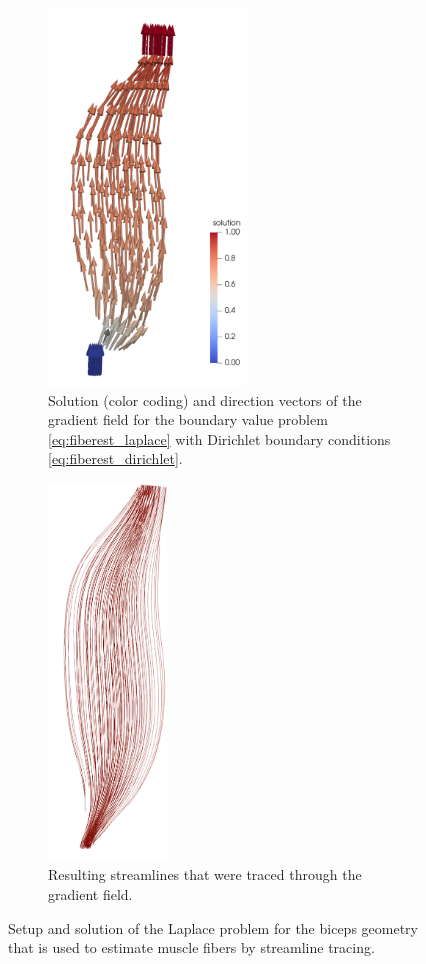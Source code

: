 \begin{figure}%
  \centering%
  \begin{subfigure}[t]{0.48\textwidth}%
    \centering%
    \includegraphics[height=10cm]{images/fiber_creation/potential_flow.png}%
    \caption{Solution (color coding) and direction vectors of the gradient field for the boundary value problem \cref{eq:fiberest_laplace} with Dirichlet boundary conditions \cref{eq:fiberest_dirichlet}.}%
    \label{fig:potential_flow}%
  \end{subfigure}
  \quad
  \begin{subfigure}[t]{0.48\textwidth}%
    \centering%
    \includegraphics[height=10cm]{images/fiber_creation/streamlines_red.png}%
    \caption{Resulting streamlines that were traced through the gradient field.}%
    \label{fig:fiber_tracing_streamlines}%
  \end{subfigure}
  \caption{Setup and solution of the Laplace problem for the biceps geometry that is used to estimate muscle fibers by streamline tracing.}%
  \label{fig:potential_flow_streamlines}%
\end{figure}%

